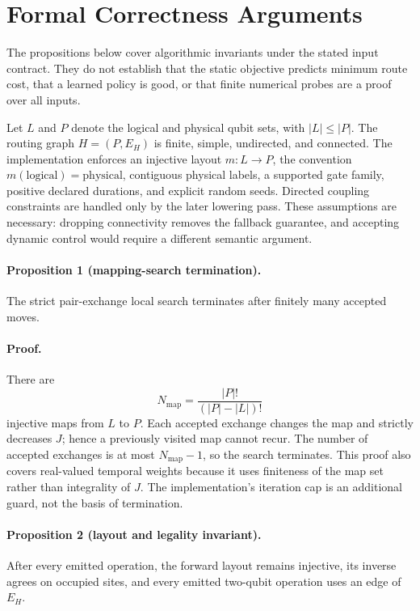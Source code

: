 \documentclass[conference]{IEEEtran}
\begin{document}
\section{Formal Correctness Arguments}
\begingroup\fontsize{11}{12.5}\selectfont
The propositions below cover algorithmic invariants under the stated input
contract. They do not establish that the static objective predicts minimum
route cost, that a learned policy is good, or that finite numerical probes are
a proof over all inputs.

Let $L$ and $P$ denote the logical and physical qubit sets, with
$|L|\leq |P|$. The routing graph $H=(P,E_H)$ is finite, simple, undirected,
and connected. The implementation enforces an injective layout
$m:L\rightarrow P$, the convention $m(\text{logical})=\text{physical}$,
contiguous physical labels, a supported gate family, positive declared
durations, and explicit random seeds. Directed coupling constraints are
handled only by the later lowering pass. These assumptions are necessary:
dropping connectivity removes the fallback guarantee, and accepting dynamic
control would require a different semantic argument.

\paragraph{Proposition 1 (mapping-search termination).}
The strict pair-exchange local search terminates after finitely many accepted
moves.

\paragraph{Proof.}
There are
{\large
\begin{equation}
 N_{\mathrm{map}}=\frac{|P|!}{(|P|-|L|)!}
 \label{eq:number-maps}
\end{equation}
}
injective maps from $L$ to $P$. Each accepted exchange changes the map and
strictly decreases $J$; hence a previously visited map cannot recur. The
number of accepted exchanges is at most $N_{\mathrm{map}}-1$, so the search
terminates. This proof also covers real-valued temporal weights because it
uses finiteness of the map set rather than integrality of $J$. The
implementation's iteration cap is an additional guard, not the basis of
termination.

\paragraph{Proposition 2 (layout and legality invariant).}
After every emitted operation, the forward layout remains injective, its
inverse agrees on occupied sites, and every emitted two-qubit operation uses an
edge of $E_H$.
\end{document}
